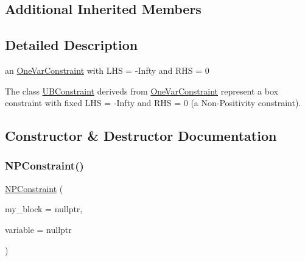 \subsection*{Additional Inherited Members}


\subsection{Detailed Description}
an \mbox{\hyperlink{class_s_m_spp__di__unipi__it_1_1_one_var_constraint}{One\+Var\+Constraint}} with L\+HS = -\/\+Infty and R\+HS = 0 

The class \mbox{\hyperlink{class_s_m_spp__di__unipi__it_1_1_u_b_constraint}{U\+B\+Constraint}} deriveds from \mbox{\hyperlink{class_s_m_spp__di__unipi__it_1_1_one_var_constraint}{One\+Var\+Constraint}} represent a box constraint with fixed L\+HS = -\/\+Infty and R\+HS = 0 (a Non-\/\+Positivity constraint). 

\subsection{Constructor \& Destructor Documentation}
\mbox{\label{class_s_m_spp__di__unipi__it_1_1_n_p_constraint_ad3dee97dc71ec7fb7eab2dcf21b21023}} 
\subsubsection{\texorpdfstring{N\+P\+Constraint()}{NPConstraint()}}
{\footnotesize\ttfamily \mbox{\hyperlink{class_s_m_spp__di__unipi__it_1_1_n_p_constraint}{N\+P\+Constraint}} (\begin{DoxyParamCaption}\item[{\mbox{\hyperlink{class_s_m_spp__di__unipi__it_1_1_block}{Block}} $\ast$}]{my\+\_\+block = {\ttfamily nullptr},  }\item[{\mbox{\hyperlink{class_s_m_spp__di__unipi__it_1_1_col_variable}{Col\+Variable}} $\ast$const}]{variable = {\ttfamily nullptr} }\end{DoxyParamCaption})\hspace{0.3cm}{\ttfamily [inline]}}



